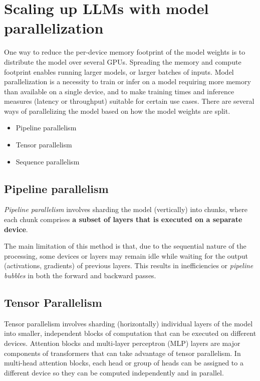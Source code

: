 \section{Scaling up LLMs with model parallelization}

One way to reduce the per-device memory footprint of the model weights is to distribute the model over several GPUs. Spreading the memory and compute footprint enables running larger models, or larger batches of inputs. Model parallelization is a necessity to train or infer on a model requiring more memory than available on a single device, and to make training times and inference measures (latency or throughput) suitable for certain use cases. There are several ways of parallelizing the model based on how the model weights are split. 

\begin{itemize}
	\item Pipeline parallelism
	\item Tensor parallelism
	\item Sequence parallelism
\end{itemize}

\subsection{Pipeline parallelism}

\textit{Pipeline parallelism} involves sharding the model (vertically) into chunks, where each chunk comprises \textbf{a subset of layers that is executed on a separate device}.

The main limitation of this method is that, due to the sequential nature of the processing, some devices or layers may remain idle while waiting for the output (activations, gradients) of previous layers. This results in inefficiencies or \textit{pipeline bubbles} in both the forward and backward passes.

\subsection{Tensor Parallelism}

Tensor parallelism involves sharding (horizontally) individual layers of the model into smaller, independent blocks of computation that can be executed on different devices. Attention blocks and multi-layer perceptron (MLP) layers are major components of transformers that can take advantage of tensor parallelism. In multi-head attention blocks, each head or group of heads can be assigned to a different device so they can be computed independently and in parallel.  

